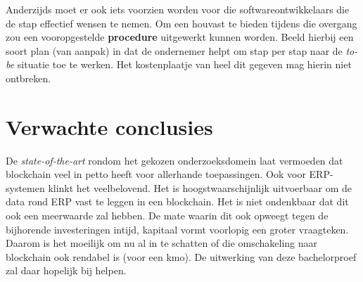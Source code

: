 Anderzijds moet er ook iets voorzien worden voor die softwareontwikkelaars die de stap effectief wensen te nemen. Om een houvast te bieden tijdens die overgang zou een vooropgestelde \textbf{procedure} uitgewerkt kunnen worden. Beeld hierbij een soort plan (van aanpak) in dat de ondernemer helpt om stap per stap naar de \textit{to-be} situatie toe te werken. Het kostenplaatje van heel dit gegeven mag hierin niet ontbreken.


\section{Verwachte conclusies}
\label{sec:verwachte_conclusies}

De \emph{state-of-the-art} rondom het gekozen onderzoeksdomein laat vermoeden dat blockchain veel in petto heeft voor allerhande toepassingen. Ook voor ERP-systemen klinkt het veelbelovend. Het is hoogstwaarschijnlijk uitvoerbaar om de data rond ERP vast te leggen in een blockchain. Het is niet ondenkbaar dat dit ook een meerwaarde zal hebben. De mate waarin dit ook opweegt tegen de bijhorende investeringen intijd, kapitaal vormt voorlopig een groter vraagteken. Daarom is het moeilijk om nu al in te schatten of die omschakeling naar blockchain ook rendabel is (voor een kmo). De uitwerking van deze bachelorproef zal daar hopelijk bij helpen.

